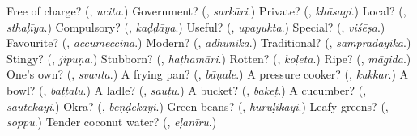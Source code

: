 \begin{tcolorbox}[breakable,colback=teal!4,colframe=teal!35!black,title={Before you move on}]
Free of charge? (\textbf{}, \emph{ucita}.) Government? (\textbf{}, \emph{sarkāri}.) Private? (\textbf{}, \emph{khāsagi}.) Local? (\textbf{}, \emph{sthaḷīya}.) Compulsory? (\textbf{}, \emph{kaḍḍāya}.) Useful? (\textbf{}, \emph{upayukta}.) Special? (\textbf{}, \emph{viśēṣa}.) Favourite? (\textbf{}, \emph{accumeccina}.) Modern? (\textbf{}, \emph{ādhunika}.) Traditional? (\textbf{}, \emph{sāmpradāyika}.) Stingy? (\textbf{}, \emph{jipuṇa}.) Stubborn? (\textbf{}, \emph{haṭhamāri}.) Rotten? (\textbf{}, \emph{koḷeta}.) Ripe? (\textbf{}, \emph{māgida}.) One's own? (\textbf{}, \emph{svanta}.) A frying pan? (\textbf{}, \emph{bāṇale}.) A pressure cooker? (\textbf{}, \emph{kukkar}.) A bowl? (\textbf{}, \emph{baṭṭalu}.) A ladle? (\textbf{}, \emph{sauṭu}.) A bucket? (\textbf{}, \emph{bakeṭ}.) A cucumber? (\textbf{}, \emph{sautekāyi}.) Okra? (\textbf{}, \emph{beṇḍekāyi}.) Green beans? (\textbf{}, \emph{huruḷikāyi}.) Leafy greens? (\textbf{}, \emph{soppu}.) Tender coconut water? (\textbf{}, \emph{eḷanīru}.)
\end{tcolorbox}
